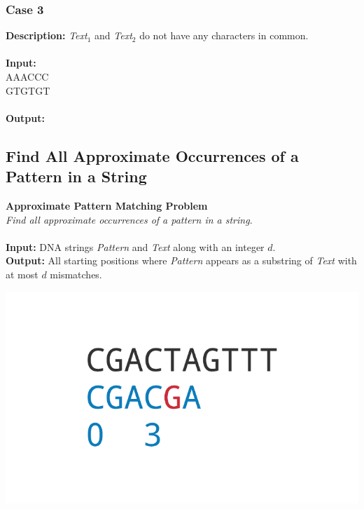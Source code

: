 \documentclass{article}
\newcommand{\code}[1]{{\fontfamily{pcr}\selectfont #1}}
\begin{document}
\subsubsection*{Case 3}
\hline \vspace{5}
\textbf{Description:} \emph{Text}$_1$ and \emph{Text}$_2$ do not have any characters in common.\\ \\
\noindent \textbf{Input:}\\
\code{AAACCC\\ GTGTGT}\\ \\
\noindent \textbf{Output:}\\
\code{6}
\pagebreak
\subsection{Find All Approximate Occurrences of a Pattern in a String}
\hline\vspace{5}
\noindent \textbf{Approximate Pattern Matching Problem}\\
\emph{Find all approximate occurrences of a pattern in a string}.\\ \\
\textbf{Input:} DNA strings \emph{Pattern} and \emph{Text} along with an integer $d$.\\
\textbf{Output:} All starting positions where \emph{Pattern} appears as a substring of \emph{Text} with at most $d$ mismatches.
\begin{center}
    \includegraphics[scale=0.2]{c1/logos/1H.png} 
\end{center}
\hline\vspace{5}
\end{document}
